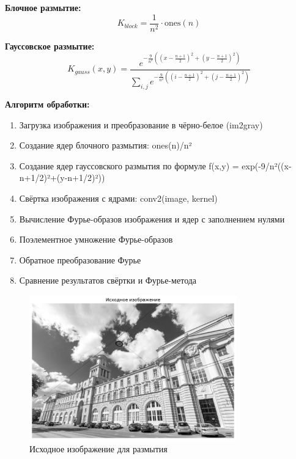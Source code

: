 \textbf{Блочное размытие:}
\begin{equation}
K_{block} = \frac{1}{n^2} \cdot \text{ones}(n)
\end{equation}

\textbf{Гауссовское размытие:}
\begin{equation}
K_{gauss}(x,y) = \frac{e^{-\frac{9}{n^2}\left((x-\frac{n+1}{2})^2 + (y-\frac{n+1}{2})^2\right)}}{\sum_{i,j} e^{-\frac{9}{n^2}\left((i-\frac{n+1}{2})^2 + (j-\frac{n+1}{2})^2\right)}}
\end{equation}

\textbf{Алгоритм обработки:}
\begin{enumerate}
    \item Загрузка изображения и преобразование в чёрно-белое (im2gray)
    \item Создание ядер блочного размытия: ones(n)/n²
    \item Создание ядер гауссовского размытия по формуле f(x,y) = exp(-9/n²((x-n+1/2)²+(y-n+1/2)²))
    \item Свёртка изображения с ядрами: conv2(image, kernel)
    \item Вычисление Фурье-образов изображения и ядер с заполнением нулями
    \item Поэлементное умножение Фурье-образов
    \item Обратное преобразование Фурье
    \item Сравнение результатов свёртки и Фурье-метода
\end{enumerate}

\begin{figure}[H]
    \centering
    \includegraphics[width=0.8\textwidth]{images/task2/original_image.png}
    \caption{Исходное изображение для размытия}
    \label{fig:original_blur}
\end{figure}

